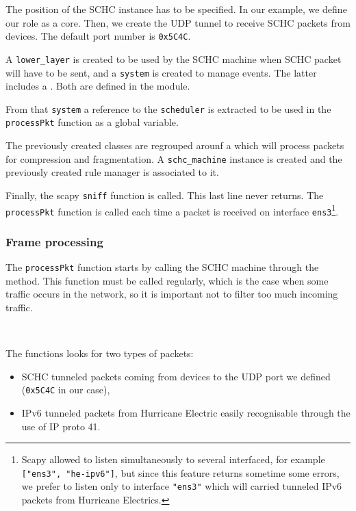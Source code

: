 The position of the SCHC instance has to be specified. In our example, we define our role as a core. Then, we create the UDP tunnel to receive SCHC packets from devices. The default port number is \texttt{0x5C4C}.

A \texttt{lower\_layer} is created to be used by the SCHC machine when SCHC packet will have to be sent, and a \texttt{system} is created to manage events. The latter includes a .  Both are defined in the  module. 


From that \texttt{system} a reference to the \texttt{scheduler} is extracted to be used in the \texttt{processPkt} function as a global variable.


The previously created classes are regrouped arounf a  which will process packets for compression and fragmentation. A \texttt{schc\_machine} instance is created and the previously created rule manager is associated to it.



Finally, the scapy \texttt{sniff} function is called. This last line never returns. The \texttt{processPkt} function is called each time a packet is received on interface \texttt{ens3}\footnote{Scapy allowed to listen simultaneously to several interfaced, for example \texttt{["ens3", "he-ipv6"]}, but since this feature returns sometime some errors, we prefer to listen only to interface \texttt{"ens3"} which will carried tunneled IPv6 packets from Hurricane Electrics.}.

\subsubsection{Frame processing}


The \texttt{processPkt} function starts by calling the SCHC machine through the  method. This function must be called regularly, which is the case when some traffic occurs in the network, so it is important not to filter too much incoming traffic.

~

The functions looks for two types of packets:
\begin{itemize}
    \item SCHC tunneled packets coming from devices to the UDP port we defined (\texttt{0x5C4C} in our case),
    \item IPv6 tunneled packets from Hurricane Electric easily recognisable through the use of IP proto 41.
\end{itemize}


